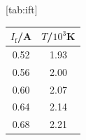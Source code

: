 [tab:ift]{
\begin{tabular}{cc}
\toprule
$I_\mathrm{f}$/A & $T$/$10^3$K \\
\midrule
0.52 & 1.93 \\
0.56 & 2.00 \\
0.60 & 2.07 \\
0.64 & 2.14 \\
0.68 & 2.21 \\
\bottomrule
\end{tabular}}
